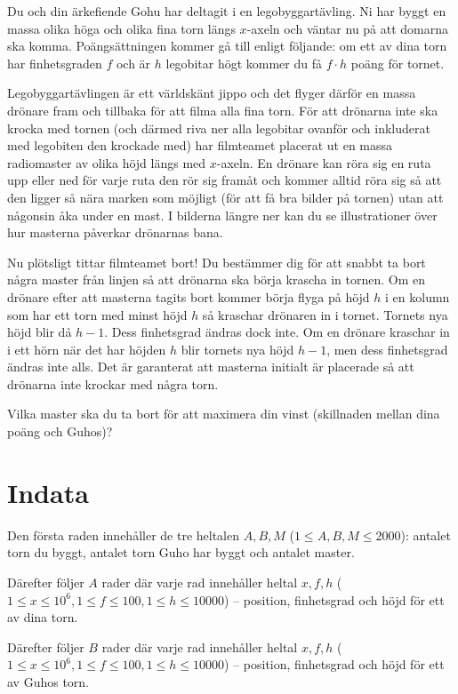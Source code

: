 Du och din ärkefiende Gohu har deltagit i en legobyggartävling.
Ni har byggt en massa olika höga och olika fina torn längs $x$-axeln och väntar nu på att domarna ska komma.
Poängsättningen kommer gå till enligt följande: om ett av dina torn har finhetsgraden $f$ och är $h$ legobitar högt kommer du få $f\cdot h$ poäng för tornet.

Legobyggartävlingen är ett världskänt jippo och det flyger därför en massa drönare fram och tillbaka för att filma alla fina torn.
För att drönarna inte ska krocka med tornen (och därmed riva ner alla legobitar ovanför och inkluderat med legobiten den krockade med) har filmteamet placerat ut en massa radiomaster av olika höjd längs med $x$-axeln.
En drönare kan röra sig en ruta upp eller ned för varje ruta den rör sig framåt och kommer alltid röra sig så att den ligger så nära marken som möjligt (för att få bra bilder på tornen) utan att någonsin åka under en mast.
I bilderna längre ner kan du se illustrationer över hur masterna påverkar drönarnas bana.

Nu plötsligt tittar filmteamet bort!
Du bestämmer dig för att snabbt ta bort några master från linjen så att drönarna ska börja krascha in tornen.
Om en drönare efter att masterna tagits bort kommer börja flyga på höjd $h$ i en kolumn som har ett torn med minst höjd $h$ så kraschar drönaren in i tornet.
Tornets nya höjd blir då $h - 1$.
Dess finhetsgrad ändras dock inte.
Om en drönare kraschar in i ett hörn när det har höjden $h$ blir tornets nya höjd $h - 1$, men dess finhetsgrad ändras inte alls.
Det är garanterat att masterna initialt är placerade så att drönarna inte krockar med några torn.

Vilka master ska du ta bort för att maximera din vinst (skillnaden mellan dina poäng och Guhos)?

\section*{Indata}
Den första raden innehåller de tre heltalen $A,B,M$ ($1 \leq A,B,M \leq 2000$): antalet torn du byggt, antalet torn Guho har byggt och antalet master.

Därefter följer $A$ rader där varje rad innehåller heltal $x,f,h$ ($1 \leq x \leq 10^6, 1 \le f \le 100, 1\leq h \leq 10000$) -- position, finhetsgrad och höjd för ett av dina torn.

Därefter följer $B$ rader där varje rad innehåller heltal $x,f,h$ ($1 \leq x \leq 10^6, 1 \le f \le 100, 1\leq h \leq 10000$) -- position, finhetsgrad och höjd för ett av Guhos torn.

